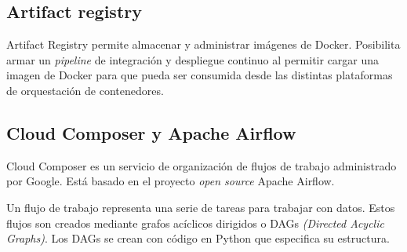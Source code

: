 \subsection{Artifact registry}

Artifact Registry permite almacenar y administrar imágenes de Docker. Posibilita armar un \textit{pipeline} de integración y despliegue continuo al permitir cargar una imagen de Docker para que pueda ser consumida desde las distintas plataformas de orquestación de contenedores.

\subsection{Cloud Composer y Apache Airflow}

Cloud Composer es un servicio de organización de flujos de trabajo administrado por Google. Está basado en el proyecto \textit{open source} Apache Airflow. 

Un flujo de trabajo representa una serie de tareas para trabajar con datos. Estos flujos son creados mediante grafos acíclicos dirigidos o DAGs \textit{(Directed Acyclic Graphs)}. Los DAGs se crean con código en Python que especifica su estructura.